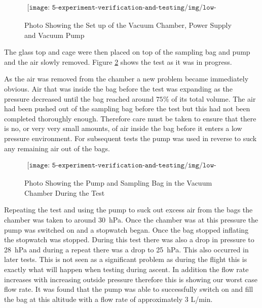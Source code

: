 \begin{figure}[H]
    \begin{align*}
        \texttt{[image: 5-experiment-verification-and-testing/img/low-pressure-set-up.png]}
    \end{align*}
    \caption {Photo Showing the Set up of the Vacuum Chamber, Power Supply and Vacuum Pump}\label{fig:pump-low-pressure-set-up}
\end{figure}

The glass top and cage were then placed on top of the sampling bag and pump and the air slowly removed. Figure \ref{fig:pump-low-pressure-progress} shows the test as it was in progress. 

As the air was removed from the chamber a new problem became immediately obvious. Air that was inside the bag before the test was expanding as the pressure decreased until the bag reached around $75\%$ of its total volume. The air had been pushed out of the sampling bag before the test but this had not been completed thoroughly enough. Therefore care must be taken to ensure that there is no, or very very small amounts, of air inside the bag before it enters a low pressure environment. For subsequent tests the pump was used in reverse to suck any remaining air out of the bags. 

\begin{figure}[H]
    \begin{align*}
        \texttt{[image: 5-experiment-verification-and-testing/img/low-pressure-in-progress.png]}
    \end{align*}
    \caption {Photo Showing the Pump and Sampling Bag in the Vacuum Chamber During the Test} \label{fig:pump-low-pressure-progress}
\end{figure}

Repeating the test and using the pump to suck out excess air from the bags the chamber was taken to around \SI{30}{\hecto\pascal}. Once the chamber was at this pressure the pump was switched on and a stopwatch began. Once the bag stopped inflating the stopwatch was stopped. During this test there was also a drop in pressure to \SI{28}{\hecto\pascal} and during a repeat there was a drop to \SI{25}{\hecto\pascal}. This also occurred in later tests. This is not seen as a significant problem as during the flight this is exactly what will happen when testing during ascent. In addition the flow rate increases with increasing outside pressure therefore this is showing our worst case flow rate. It was found that the pump was able to successfully switch on and fill the bag at this altitude with a flow rate of approximately 3 L/min. 

